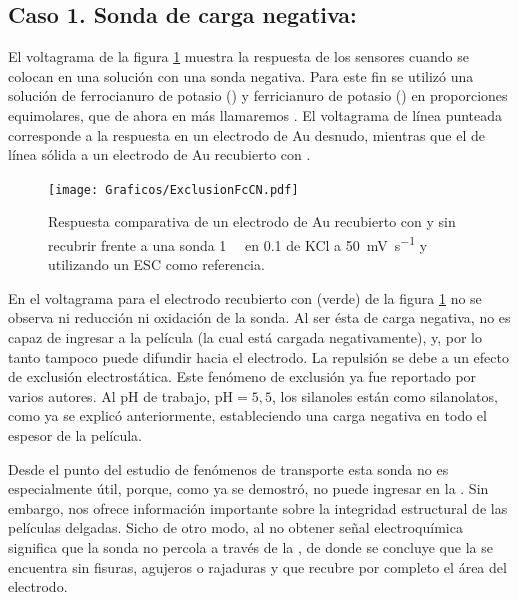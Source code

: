 	\subsection{Caso 1. Sonda de carga negativa: \texorpdfstring{\ferroferri}{ferroferri}}

	 El voltagrama de la figura \ref{fig:exclusion_vs_Au} muestra la respuesta de los sensores cuando se colocan en una solución con una sonda negativa. Para este fin se utilizó una solución de ferrocianuro de potasio (\ferroCompleto) y ferricianuro de potasio (\ferriCompleto) en proporciones equimolares, que de ahora en más llamaremos \fe. El voltagrama de línea punteada corresponde a la respuesta en un electrodo de Au desnudo, mientras que el de línea sólida a un electrodo de Au recubierto con \pdmF.
	
			\begin{figure}[ht]
				\centering
		 	    \texttt{[image: Graficos/ExclusionFcCN.pdf]}
		        \caption[Exclusión electrostática en \pdmF]{Respuesta comparativa de un electrodo de Au recubierto con \pdmF\space y sin recubrir frente a una sonda \fe\space \SI{1}{\milli\Molar} en \SI{0.1}{\Molar} de KCl a \SI{50}{\milli\volt\per\second} y utilizando un ESC como referencia.}
		        \label{fig:exclusion_vs_Au}
		      	\end{figure}
	
	 En el voltagrama para el electrodo recubierto con \pdmF\space (verde) de la figura \ref{fig:exclusion_vs_Au} no se observa ni reducción ni oxidación de la sonda. Al ser ésta de carga negativa, no es capaz de ingresar a la película (la cual está cargada negativamente), y, por lo tanto tampoco puede difundir hacia el electrodo. La repulsión se debe a un efecto de exclusión electrostática. Este fenómeno de exclusión ya fue reportado por varios autores\cite{alberti2015,schmuhl2005,Andrieu-Brunsen2015,brunsen2011}. Al pH de trabajo, $\text{pH}=5,5$, los silanoles están como silanolatos, como ya se explicó anteriormente, estableciendo una carga negativa en todo el espesor de la película.

	 Desde el punto del estudio de fenómenos de  transporte esta sonda no es especialmente útil, porque, como ya se demostró, no puede ingresar en la \pdm. Sin embargo, nos ofrece información importante sobre la integridad estructural de las películas delgadas. Sicho de otro modo, al no obtener señal electroquímica significa que la sonda no percola a través de la \pdm, de donde se concluye que la \pdm\space se encuentra sin fisuras, agujeros o rajaduras y que recubre por completo el área del electrodo. 

